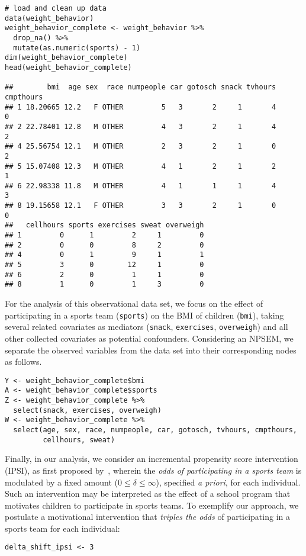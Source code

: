\begin{lstlisting}
# load and clean up data
data(weight_behavior)
weight_behavior_complete <- weight_behavior %>%
  drop_na() %>%
  mutate(as.numeric(sports) - 1)
dim(weight_behavior_complete)
head(weight_behavior_complete)

##        bmi  age sex  race numpeople car gotosch snack tvhours cmpthours
## 1 18.20665 12.2   F OTHER         5   3       2     1       4         0
## 2 22.78401 12.8   M OTHER         4   3       2     1       4         2
## 4 25.56754 12.1   M OTHER         2   3       2     1       0         2
## 5 15.07408 12.3   M OTHER         4   1       2     1       2         1
## 6 22.98338 11.8   M OTHER         4   1       1     1       4         3
## 8 19.15658 12.1   F OTHER         3   3       2     1       0         0
##   cellhours sports exercises sweat overweigh
## 1         0      1         2     1         0
## 2         0      0         8     2         0
## 4         0      1         9     1         1
## 5         3      0        12     1         0
## 6         2      0         1     1         0
## 8         1      0         1     3         0
\end{lstlisting}

For the analysis of this observational data set, we focus on the effect of
participating in a sports team (\texttt{sports}) on the BMI of children
(\texttt{bmi}), taking several related covariates as mediators (\texttt{snack},
\texttt{exercises}, \texttt{overweigh}) and all other collected covariates as
potential confounders. Considering an NPSEM, we separate the observed variables
from the data set into their corresponding nodes as follows.

\begin{lstlisting}
Y <- weight_behavior_complete$bmi
A <- weight_behavior_complete$sports
Z <- weight_behavior_complete %>%
  select(snack, exercises, overweigh)
W <- weight_behavior_complete %>%
  select(age, sex, race, numpeople, car, gotosch, tvhours, cmpthours,
         cellhours, sweat)
\end{lstlisting}

Finally, in our analysis, we consider an incremental propensity score
intervention (IPSI), as first proposed by~\citet{kennedy2017nonparametric},
wherein the \textit{odds of participating in a sports team} is modulated by
a fixed amount ($0 \leq \delta \leq \infty$), specified \textit{a priori}, for
each individual. Such an intervention may be interpreted as the effect of
a school program that motivates children to participate in sports teams. To
exemplify our approach, we postulate a motivational intervention that
\textit{triples the odds} of participating in a sports team for each individual:
\begin{lstlisting}
delta_shift_ipsi <- 3
\end{lstlisting}

